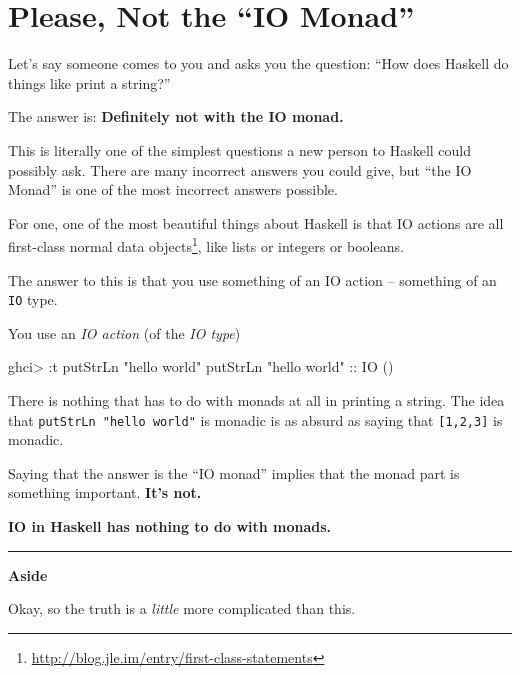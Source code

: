 \documentclass[]{article}
\newenvironment{Shaded}{}{}
\newcommand{\DataTypeTok}[1]{\textcolor[rgb]{0.56,0.13,0.00}{#1}}
\newcommand{\FunctionTok}[1]{\textcolor[rgb]{0.02,0.16,0.49}{#1}}
\newcommand{\NormalTok}[1]{#1}
\newcommand{\OperatorTok}[1]{\textcolor[rgb]{0.40,0.40,0.40}{#1}}
\newcommand{\OtherTok}[1]{\textcolor[rgb]{0.00,0.44,0.13}{#1}}
\newcommand{\StringTok}[1]{\textcolor[rgb]{0.25,0.44,0.63}{#1}}
\renewcommand{\href}[2]{#2\footnote{\url{#1}}}
\begin{document}
\hypertarget{please-not-the-io-monad}{%
\section{Please, Not the ``IO Monad''}\label{please-not-the-io-monad}}

Let's say someone comes to you and asks you the question: ``How does Haskell do
things like print a string?''

The answer is: \textbf{Definitely not with the IO monad.}

This is literally one of the simplest questions a new person to Haskell could
possibly ask. There are many incorrect answers you could give, but ``the IO
Monad'' is one of the most incorrect answers possible.

For one, one of the most beautiful things about Haskell is that IO actions are
all \href{http://blog.jle.im/entry/first-class-statements}{first-class normal
data objects}, like lists or integers or booleans.

The answer to this is that you use something of an IO action -- something of an
\texttt{IO} type.

You use an \emph{IO action} (of the \emph{IO type})

\begin{Shaded}
\begin{Highlighting}[]
\NormalTok{ghci}\OperatorTok{>} \OperatorTok{:}\NormalTok{t }\FunctionTok{putStrLn} \StringTok{"hello world"}
\FunctionTok{putStrLn} \StringTok{"hello world"}\OtherTok{ ::} \DataTypeTok{IO}\NormalTok{ ()}
\end{Highlighting}
\end{Shaded}

There is nothing that has to do with monads at all in printing a string. The
idea that \texttt{putStrLn\ "hello\ world"} is monadic is as absurd as saying
that \texttt{{[}1,2,3{]}} is monadic.

Saying that the answer is the ``IO monad'' implies that the monad part is
something important. \textbf{It's not.}

\textbf{IO in Haskell has nothing to do with monads.}

\begin{center}\rule{0.5\linewidth}{\linethickness}\end{center}

\textbf{Aside}

Okay, so the truth is a \emph{little} more complicated than this.
\end{document}
